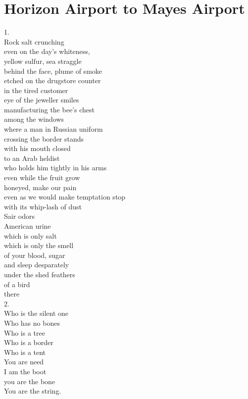 \documentclass[smalldemyvopaper,11pt,twoside,onecolumn,openright,extrafontsizes]{memoir}
\begin{document}
\chapter{Horizon Airport to Mayes Airport}
1.
\\Rock salt crunching
\\even on the day's whiteness,
\\yellow sulfur, sea straggle
\\behind the face, plume of smoke
\\etched on the drugstore counter
\\in the tired customer
\\eye of the jeweller smiles
\\manufacturing the bee's chest
\\among the windows
\\where a man in Russian uniform
\\crossing the border stands
\\with his mouth closed
\\to an Arab heldist
\\who holds him tightly in his arms
\\even while the fruit grow
\\honeyed, make our pain
\\even as we would make temptation stop
\\with its whip-lash of dust
\\Sair odors
\\American urine
\\which is only salt
\\which is only the smell
\\of your blood, sugar
\\and sleep desparately
\\under the shed feathers
\\of a bird
\\there
\\2.
\\Who is the silent one
\\Who has no bones
\\Who is a tree
\\Who is a border
\\Who is a tent
\\You are need
\\I am the boot
\\you are the bone
\\You are the string.
\end{document}
